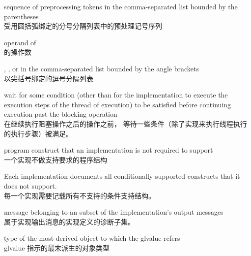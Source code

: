 %
%
 sequence of preprocessing tokens in the
comma-separated list bounded by the parentheses \\
受用圆括弧绑定的分号分隔列表中的预处理记号序列

%
%
 operand of  \\
 的操作数

%
%
,
, or
 in the comma-separated
list bounded by the angle brackets \\
以尖括号绑定的逗号分隔列表

%
wait for some condition (other than for the implementation to execute
the execution steps of the thread of execution) to be satisfied before
continuing execution past the blocking operation \\
在继续执行阻塞操作之后的操作之前，
等待一些条件（除了实现来执行线程执行的执行步骤）被满足。

%
program construct that an implementation is not required to support \\
一个实现不做支持要求的程序结构

\begin{defnote}
Each implementation documents all conditionally-supported
constructs that it does not support. \\
每一个实现需要记载所有不支持的条件支持结构。
\end{defnote}

%
message belonging to an  subset of the
implementation's output messages \\
属于实现输出消息的实现定义的诊断子集。

%
 type of the most derived object to which the
glvalue refers \\
glvalue 指示的最末派生的对象类型

